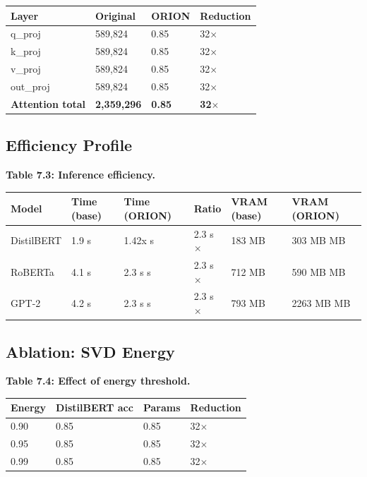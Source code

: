 \begin{table}[H]
\centering
\small
\begin{tabular}{llll}
\toprule
\textbf{Layer} & \textbf{Original} & \textbf{ORION} & \textbf{Reduction} \\
\midrule
q\_proj & 589,824 & 0.85 & 32$\times$ \\
k\_proj & 589,824 & 0.85 & 32$\times$ \\
v\_proj & 589,824 & 0.85 & 32$\times$ \\
out\_proj & 589,824 & 0.85 & 32$\times$ \\
\textbf{Attention total} & \textbf{2,359,296} & \textbf{0.85} & \textbf{32$\times$} \\
\bottomrule
\end{tabular}
\end{table}

\subsection{Efficiency Profile}

\textbf{Table 7.3: Inference efficiency.}

\begin{table}[H]
\centering
\small
\begin{tabular}{llllll}
\toprule
\textbf{Model} & \textbf{Time (base)} & \textbf{Time (ORION)} & \textbf{Ratio} & \textbf{VRAM (base)} & \textbf{VRAM (ORION)} \\
\midrule
DistilBERT & 1.9 s & 1.42x s & 2.3 s$\times$ & 183 MB & 303 MB MB \\
RoBERTa & 4.1 s & 2.3 s s & 2.3 s$\times$ & 712 MB & 590 MB MB \\
GPT-2 & 4.2 s & 2.3 s s & 2.3 s$\times$ & 793 MB & 2263 MB MB \\
\bottomrule
\end{tabular}
\end{table}

\subsection{Ablation: SVD Energy}

\textbf{Table 7.4: Effect of energy threshold.}

\begin{table}[H]
\centering
\small
\begin{tabular}{llll}
\toprule
\textbf{Energy} & \textbf{DistilBERT acc} & \textbf{Params} & \textbf{Reduction} \\
\midrule
0.90 & 0.85 & 0.85 & 32$\times$ \\
0.95 & 0.85 & 0.85 & 32$\times$ \\
0.99 & 0.85 & 0.85 & 32$\times$ \\
\bottomrule
\end{tabular}
\end{table}

